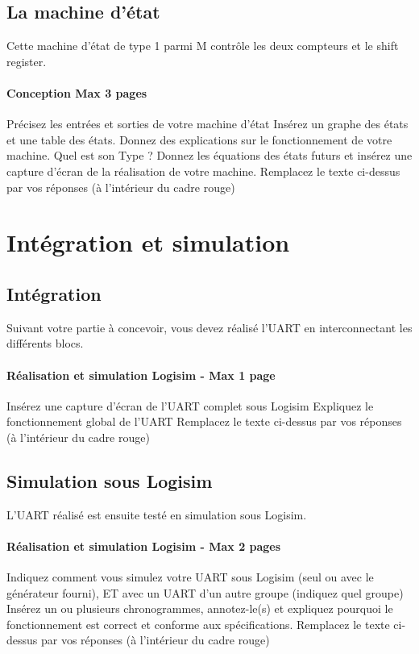 \documentclass[a4paper]{article} %
\begin{document}
\subsection{La machine d’état}
Cette machine d’état de type 1 parmi M contrôle les deux compteurs et le shift register. 
\begin{tcolorbox}[colframe=Monokaimagenta,colback=white]
\paragraph{Conception Max 3 pages}
Précisez les entrées et sorties de votre machine d’état
Insérez un graphe des états et une table des états. Donnez des explications sur le fonctionnement de votre machine. Quel est son Type ?
Donnez les équations des états futurs et insérez une capture d’écran de la réalisation de votre machine.
Remplacez le texte ci-dessus par vos réponses (à l’intérieur du cadre rouge)
\\
\end{tcolorbox}
\section {Intégration et simulation}
\subsection{Intégration}
Suivant votre partie à concevoir, vous devez réalisé l’UART en interconnectant les différents blocs. 
\begin{tcolorbox}[colframe=Monokaimagenta,colback=white]
\paragraph{Réalisation et simulation Logisim - Max 1 page}
Insérez une capture d’écran de l’UART complet sous Logisim
Expliquez le fonctionnement global de l’UART
Remplacez le texte ci-dessus par vos réponses (à l’intérieur du cadre rouge)
\\
\end{tcolorbox}
 \subsection{Simulation sous Logisim}
L’UART réalisé est ensuite testé en simulation sous Logisim.
\begin{tcolorbox}[colframe=Monokaimagenta,colback=white]
\paragraph{Réalisation et simulation Logisim - Max 2 pages}
Indiquez comment vous simulez votre UART sous Logisim (seul ou avec le générateur fourni), ET avec un UART d’un autre groupe (indiquez quel groupe)
Insérez un ou plusieurs chronogrammes, annotez-le(s) et expliquez pourquoi le fonctionnement est correct et conforme aux spécifications.
Remplacez le texte ci-dessus par vos réponses (à l’intérieur du cadre rouge)
\\
\end{tcolorbox}
\end{document}
